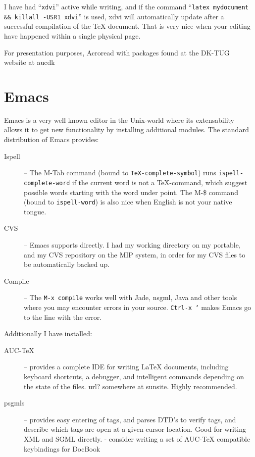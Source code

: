 I have had ``\texttt{xdvi}'' active while writing, and if the command
``\texttt{latex mydocument \&\& killall -USR1 xdvi}'' is used, xdvi
will automatically update after a successful compilation of the
TeX-document.  That is very nice when your editing have happened
within a single physical page.

For presentation purposes, \textsf{Acroread with packages found at the
  DK-TUG website at aucdk}

\section{Emacs} 
\label{sec:report-writing-tools-emacs} 


Emacs is a very well known editor in the Unix-world where its
extensability allows it to get new functionality by installing
additional modules.  The standard distribution of Emacs provides:

\begin{description}
\item[Ispell] -- The M-Tab command (bound to
  \texttt{TeX-complete-symbol}) runs \texttt{ispell-complete-word} if
  the current word is not a {\TeX}-command, which suggest possible
  words starting with the word under point.  The M-\$ command (bound
  to \texttt{ispell-word}) is also nice when English is not your
  native tongue.
\item[CVS] -- Emacs supports  directly.  I
  had my working directory on my portable, and my CVS repository on
  the MIP system, in order for my CVS files to be automatically backed
  up. 
\item[Compile] -- The \texttt{M-x compile} works well with Jade,
  nsgml, Java and other tools where you may encounter errors in your
  source.  \texttt{Ctrl-x `} makes Emacs go to the line with the
  error.
  
\end{description}

Additionally I have installed:


\begin{description}
\item[AUC-TeX] -- provides a complete IDE for writing {\LaTeX}
  documents, including keyboard shortcuts, a debugger, and intelligent
  commands depending on the state of the files.  \textsf{url?
    somewhere at sunsite}.  Highly recommended.
\item[psgmls] -- provides easy entering of tags, and parses DTD's to
  verify tags, and describe which tags are open at a given cursor
  location.   Good for writing XML and SGML directly.
   - \textsf{consider writing a set of AUC-TeX
    compatible keybindings for DocBook}
\end{description}



